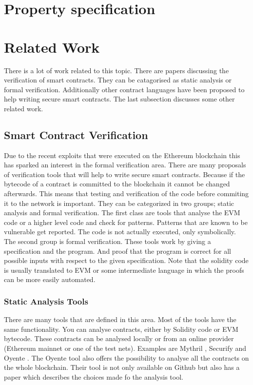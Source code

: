 \documentclass[a4paper]{article}
\begin{document}
\section{Property specification}


\section{Related Work}
There is a lot of work related to this topic. There are papers discussing the verification of smart contracts. They can be catagorised as static analysis or formal verification. Additionally other contract languages have been proposed to help writing secure smart contracts. The last subsection discusses some other related work.

\subsection{Smart Contract Verification}
Due to the recent exploits that were executed on the Ethereum blockchain this has sparked an interest in the formal verification area. There are many proposals of verification tools that will help to write secure smart contracts. Because if the bytecode of a contract is committed to the blockchain it cannot be changed afterwards. This means that testing and verification of the code before commiting it to the network is important. They can be categorized in two groups; static analysis and formal verification. The first class are tools that analyse the EVM code or a higher level code and check for patterns. Patterns that are known to be vulnerable get reported. The code is not actually executed, only symbolically. The second group is formal verification. These tools work by giving a specification and the program. And proof that the program is correct for all possible inputs with respect to the given specification. Note that the solidity code is usually translated to EVM or some intermediate language in which the proofs can be more easily automated.
\subsubsection{Static Analysis Tools}
There are many tools that are defined in this area. Most of the tools have the same functionality. You can analyse contracts, either by Solidity code or EVM bytecode. These contracts can be analysed locally or from an online provider (Ethereum mainnet or one of the test nets). Examples are Mythril \cite{mythrilrepo}, Securify \cite{securifywebsite} and Oyente \cite{luu2016making}. The Oyente tool also offers the possibility to analyse all the contracts on the whole blockchain. Their tool is not only available on Github but also has a paper which describes the choices made fo the analysis tool.
\end{document}
